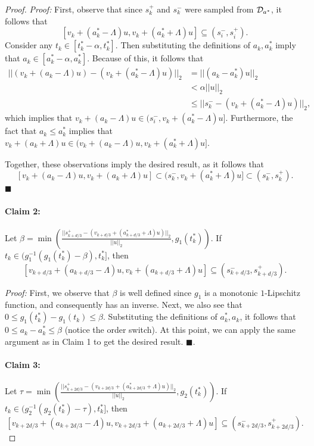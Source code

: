 \begin{proof}
\textit{Proof: } First, observe that since $s_k^+$ and $s_k^-$ were sampled from ${\mathcal D}_{a^*}$, it follows that $$[v_k + (a_k^* - \Lambda)u, v_k + (a_k^* + \Lambda)u] \subseteq (s_i^-, s_i^+).$$ Consider any $t_k \in [t_k^* - \alpha, t_k^*]$. Then substituting the definitions of $a_k, a_k^*$ imply that $a_k \in [a_k^* - \alpha, a_k^*]$. Because of this, it follows that 
\begin{equation*}
\begin{split}
||(v_k + (a_k - \Lambda)u) - (v_k + (a_k^* - \Lambda)u)||_2 &= ||(a_k - a_k^*)u||_2 \\
&< \alpha||u||_2 \\
&\leq ||s_k^- - (v_k + (a_k^* - \Lambda)u)||_2,
\end{split}
\end{equation*}
which implies that $v_k + (a_k - \Lambda)u \in (s_i^-, v_k + (a_k^* - \Lambda)u]$. Furthermore, the fact that $a_k \leq a_k^*$ implies that $v_k + (a_k + \Lambda)u \in (v_k + (a_k - \Lambda)u, v_k + (a_k^* + \Lambda)u]$. 

Together, these observations imply the desired result, as it follows that $$[v_k + (a_k - \Lambda)u, v_k + (a_k + \Lambda)u] \subset (s_k^-, v_k + (a_k^* + \Lambda)u] \subset (s_k^-, s_k^+).$$ $\blacksquare$

\paragraph{Claim 2:} Let $\beta = \min \left(\frac{||s_{k+d/3}^+ -  (v_{k+d/3} + (a_{k+d/3}^* + \Lambda)u)||_2}{||u||_2}, g_1(t_{k}^*)\right)$. If $t_k \in (g_1^{-1}(g_1(t_k^*) - \beta), t_k^*]$, then $$[v_{k+d/3} + (a_{k+d/3} - \Lambda)u, v_k + (a_{k+d/3} + \Lambda)u] \subseteq (s_{k+d/3}^-, s_{k+d/3}^+).$$ 

\textit{Proof: } First, we observe that $\beta$ is well defined since $g_1$ is a monotonic $1$-Lipschitz function, and consequently has an inverse. Next, we also see that $0 \leq g_1(t_k^*) - g_1(t_k) \leq \beta$. Substituting the definitions of $a_k^*, a_k$, it follows that $0 \leq a_k - a_k^* \leq \beta$ (notice the order switch). At this point, we can apply the same argument as in Claim 1 to get the desired result.  $\blacksquare$.

\paragraph{Claim 3:} Let $\tau = \min \left(\frac{||s_{k+2d/3}^+ -  (v_{k+2d/3} + (a_{k+2d/3}^* + \Lambda)u)||_2}{||u||_2}, g_2(t_k^*)\right)$. If $t_k \in (g_2^{-1}(g_2(t_k^*) - \tau), t_k^*]$, then $$[v_{k+2d/3} + (a_{k+2d/3} - \Lambda)u, v_{k+2d/3} + (a_{k+2d/3} + \Lambda)u] \subseteq (s_{k+2d/3}^-, s_{k+2d/3}^+).$$  


\end{proof}
